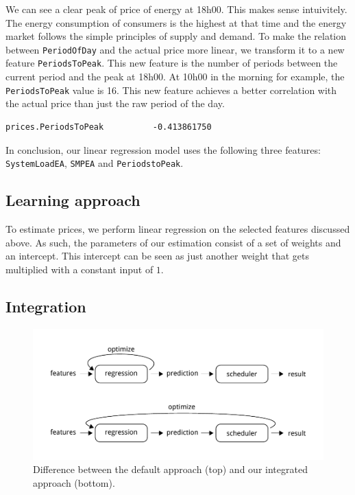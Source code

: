 \documentclass{article}
\begin{document}
We can see a clear peak of price of energy at 18h00. This makes sense intuivitely. The energy consumption of consumers is the highest at that time and the energy market follows the simple principles of supply and demand. To make the relation between \verb|PeriodOfDay| and the actual price more linear, we transform it to a new feature \verb|PeriodsToPeak|. This new feature is the number of periods between the current period and the peak at 18h00. At 10h00 in the morning for example, the \verb|PeriodsToPeak| value is 16. This new feature achieves a better correlation with the actual price than just the raw period of the day.
\begin{verbatim}
prices.PeriodsToPeak          -0.413861750
\end{verbatim}
In conclusion, our linear regression model uses the following three features: \verb|SystemLoadEA|, \verb|SMPEA| and \verb|PeriodstoPeak|.

\subsection{Learning approach}
To estimate prices, we perform linear regression on the selected features discussed above. As such, the parameters of our estimation consist of a set of weights and an intercept. This intercept can be seen as just another weight that gets multiplied with a constant input of $1$. 

\subsection{Integration}

\begin{figure}
	\centering
	\includegraphics[width=\textwidth]{img/feedback.pdf}
	\caption{Difference between the default approach (top) and our integrated approach (bottom).}
	\label{fig:feedback}
\end{figure}
\end{document}
